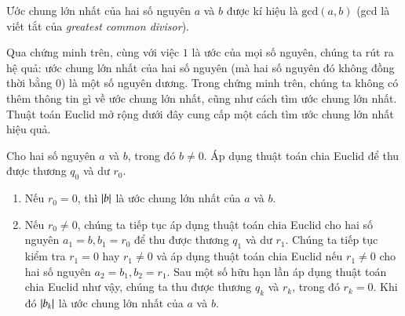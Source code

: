 Ước chung lớn nhất của hai số nguyên $a$ và $b$ được kí hiệu là $\text{gcd}(a, b)$ (gcd là viết tắt của \textit{greatest common divisor}).

Qua chứng minh trên, cùng với việc $1$ là ước của mọi số nguyên, chúng ta rút ra hệ quả: ước chung lớn nhất của hai số nguyên (mà hai số nguyên đó không đồng thời bằng $0$) là một số nguyên dương. Trong chứng minh trên, chúng ta không có thêm thông tin gì về ước chung lớn nhất, cũng như cách tìm ước chung lớn nhất. Thuật toán Euclid mở rộng dưới đây cung cấp một cách tìm ước chung lớn nhất hiệu quả.

\begin{theorem}
	Cho hai số nguyên $a$ và $b$, trong đó $b\ne 0$. Áp dụng thuật toán chia Euclid để thu được thương $q_{0}$ và dư $r_{0}$.

	\begin{enumerate}[label={(\roman*)}]
		\item Nếu $r_{0} = 0$, thì $\left\vert{b}\right\vert$ là ước chung lớn nhất của $a$ và $b$.
		\item Nếu $r_{0}\ne 0$, chúng ta tiếp tục áp dụng thuật toán chia Euclid cho hai số nguyên $a_{1} = b, b_{1} = r_{0}$ để thu được thương $q_{1}$ và dư $r_{1}$. Chúng ta tiếp tục kiểm tra $r_{1} = 0$ hay $r_{1}\ne 0$ và áp dụng thuật toán chia Euclid nếu $r_{1}\ne 0$ cho hai số nguyên $a_{2} = b_{1}, b_{2} = r_{1}$. Sau một số hữu hạn lần áp dụng thuật toán chia Euclid như vậy, chúng ta thu được thương $q_{k}$ và $r_{k}$, trong đó $r_{k} = 0$. Khi đó $\left\vert{b_{k}}\right\vert$ là ước chung lớn nhất của $a$ và $b$.
	\end{enumerate}
\end{theorem}

